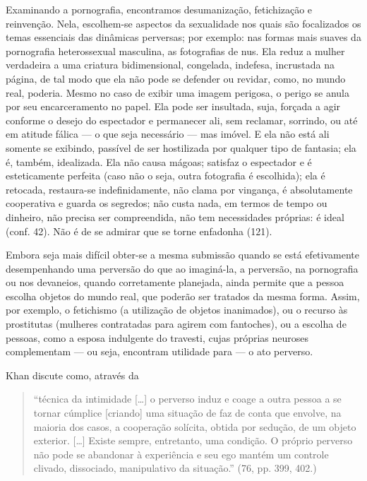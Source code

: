 Examinando a pornografia, encontramos desumanização,\idxpornodesu{} fetichização e
reinvenção. Nela, escolhem-se aspectos da sexualidade nos quais são
focalizados os temas essenciais das dinâmicas perversas; por exemplo:
nas formas mais suaves da pornografia heterossexual masculina, as
fotografias de nus. Ela reduz a mulher verdadeira a uma criatura
bidimensional, congelada, indefesa, incrustada na página, de tal modo
que ela não pode se defender ou revidar, como, no mundo real, poderia.
Mesmo no caso de exibir uma imagem perigosa, o perigo se anula por seu
encarceramento no papel. Ela pode ser insultada, suja, forçada a agir
conforme o desejo do espectador e permanecer ali, sem reclamar,
sorrindo, ou até em atitude fálica --- o que seja necessário --- mas
imóvel. E ela não está ali somente se exibindo, passível de ser
hostilizada por qualquer tipo de fantasia; ela é, também, idealizada.\idxpornoidea{}
Ela não causa mágoas; satisfaz o espectador e é esteticamente perfeita
(caso não o seja, outra fotografia é escolhida); ela é retocada,
restaura-se indefinidamente, não clama por vingança, é absolutamente
cooperativa e guarda os segredos; não custa nada, em termos de tempo ou
dinheiro, não precisa ser compreendida, não tem necessidades próprias:
é ideal (conf. 42). Não é de se admirar que se torne\idxpornoenfa{} enfadonha (121).

Embora seja mais difícil obter-se a mesma submissão quando se está
efetivamente desempenhando uma perversão do que ao imaginá-la, a
perversão, na pornografia ou nos devaneios, quando corretamente
planejada, ainda permite que a pessoa escolha objetos do mundo real,
que poderão ser tratados da mesma forma. Assim, por exemplo, o
fetichismo (a utilização de objetos inanimados), ou o recurso às
prostitutas\idxprost{} (mulheres contratadas para agirem com fantoches), ou a
escolha de pessoas, como a esposa\idxtravempape{} indulgente do travesti, cujas
próprias neuroses complementam --- ou seja, encontram utilidade para
--- o ato perverso.

Khan\idxkhan{} discute como, através da

\begin{quote}
  ``técnica\idxpervtecni{} da intimidade\idxintim{} [\ldots{}] o perverso induz e coage a
  outra pessoa a se tornar cúmplice [criando] uma situação de
  faz de conta que envolve, na maioria dos casos, a cooperação solícita,
  obtida por sedução, de um objeto exterior. [\ldots{}] Existe sempre,
  entretanto, uma condição. O próprio perverso não pode se abandonar à
  experiência e seu ego mantém um controle clivado, dissociado,
  manipulativo da situação.'' (76, pp. 399, 402.)
\end{quote}

